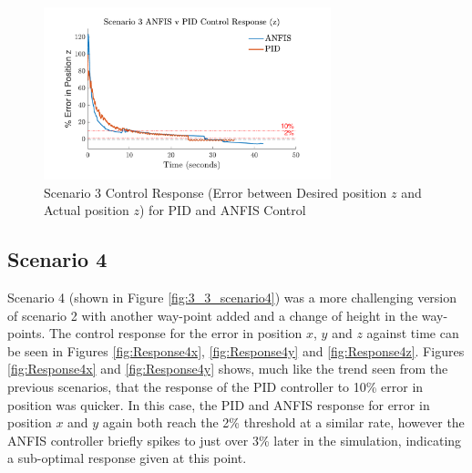 \begin{figure}[H]
    \centering
    \begin{minipage}[b]{0.45\textwidth}
    \end{minipage}
    \hfill
    \begin{minipage}[b]{0.45\textwidth}
        \centering
        \includegraphics[height=5cm,keepaspectratio]{img/Scenario 3 Error in z Position.pdf}
        \caption{Scenario 3 Control Response (Error between Desired position $z$ and Actual position $z$) for PID and ANFIS Control}
        \label{fig:Response3z}
    \end{minipage}
    \hfill
    \begin{minipage}[b]{0.45\textwidth}
    \end{minipage}
\end{figure}

\subsection{Scenario 4}

Scenario 4 (shown in Figure \ref{fig:3_3_scenario4}) was a more challenging version of scenario 2 with another way-point added and a change of height in the way-points. The control response for the error in position $x$, $y$ and $z$ against time can be seen in Figures \ref{fig:Response4x}, \ref{fig:Response4y} and \ref{fig:Response4z}. Figures \ref{fig:Response4x} and \ref{fig:Response4y} shows, much like the trend seen from the previous scenarios, that the response of the PID controller to 10\% error in position was quicker. In this case, the PID and ANFIS response for error in position $x$ and $y$ again both reach the 2\% threshold at a similar rate, however the ANFIS controller briefly spikes to just over 3\% later in the simulation, indicating a sub-optimal response given at this point. 

